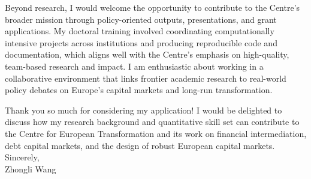 \documentclass[11pt]{article}
\begin{document}
Beyond research, I would welcome the opportunity to contribute to the Centre's broader mission through policy-oriented outputs, presentations, and grant applications. 
My doctoral training involved coordinating computationally intensive projects across institutions and producing reproducible code and documentation, which aligns well with the Centre's emphasis on high-quality, team-based research and impact. 
I am enthusiastic about working in a collaborative environment that links frontier academic research to real-world policy debates on Europe's capital markets and long-run transformation.

Thank you so much for considering my application! 
I would be delighted to discuss how my research background and quantitative skill set can contribute to the Centre for European Transformation and its work on financial intermediation, debt capital markets, and the design of robust European capital markets.\\[2mm]

\noindent Sincerely,\\[12mm]
\noindent Zhongli Wang
\end{document}
